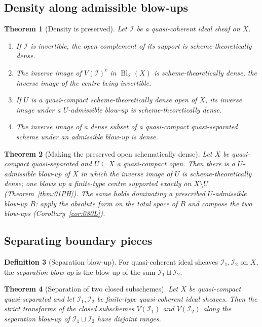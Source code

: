 \documentclass[11pt,a4paper]{article}
\theoremstyle{plain}
\newtheorem{theorem}{Theorem}[section]
\theoremstyle{definition}
\newtheorem{definition}[theorem]{Definition}
\theoremstyle{remark}
\newcommand{\Bl}{\operatorname{Bl}}
\newcommand{\sI}{\mathcal{I}}
\newcommand{\qcqs}{quasi-compact quasi-separated}
\begin{document}
\subsection{Density along admissible blow-ups}

\begin{theorem}[Density is preserved]
\label{thm:admissible-density}
Let $\sI$ be a quasi-coherent ideal sheaf on $X$.
\begin{enumerate}[label=\textup{(\roman*)}, itemsep=1pt]
\item If $\sI$ is invertible, the open complement of its support is
      scheme-theoretically dense.
\item The inverse image of $V(\sI)^{c}$ in $\Bl_\sI(X)$ is
      scheme-theoretically dense, the inverse image of the centre being
      invertible.
\item If $U$ is a quasi-compact scheme-theoretically dense open of $X$, its
      inverse image under a $U$-admissible blow-up is scheme-theoretically
      dense.
\item The inverse image of a dense subset of a \qcqs{} scheme under an
      admissible blow-up is dense.
\end{enumerate}
\end{theorem}

\begin{theorem}[Making the preserved open schematically dense]
\label{thm:dense-admissible-exists}
Let $X$ be \qcqs{} and $U\subseteq X$ a quasi-compact open. Then there is a
$U$-admissible blow-up of $X$ in which the inverse image of $U$ is
scheme-theoretically dense; one blows up a finite-type centre supported exactly
on $X\setminus U$ (Theorem~\ref{thm:01PH}). The same holds dominating a
prescribed $U$-admissible blow-up $B$: apply the absolute form on the total
space of $B$ and compose the two blow-ups (Corollary~\ref{cor:080L}).
\end{theorem}

\subsection{Separating boundary pieces}

\begin{definition}[Separation blow-up]
\label{def:separation-blowup}
For quasi-coherent ideal sheaves $\sI_1,\sI_2$ on $X$, the \emph{separation
blow-up} is the blow-up of the sum $\sI_1\sqcup\sI_2$.
\end{definition}

\begin{theorem}[Separation of two closed subschemes]
\label{thm:0F3V}
Let $X$ be \qcqs{} and let $\sI_1,\sI_2$ be finite-type quasi-coherent ideal
sheaves. Then the strict transforms of the closed subschemes $V(\sI_1)$ and
$V(\sI_2)$ along the separation blow-up of $\sI_1\sqcup\sI_2$ have disjoint
ranges.
\end{theorem}
\end{document}
